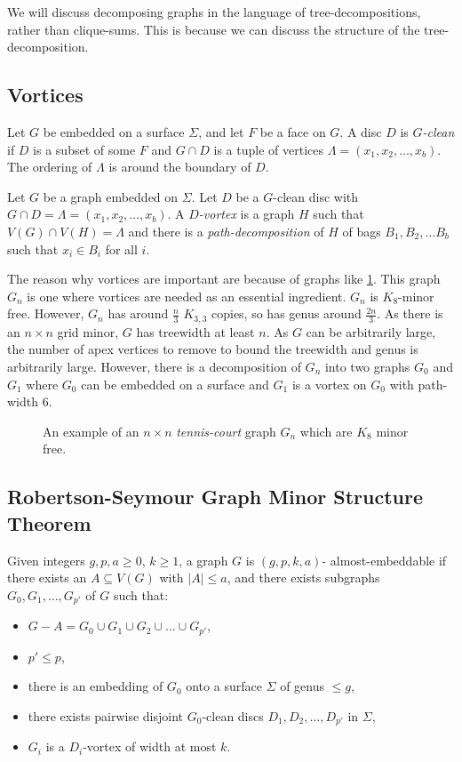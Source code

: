 We will discuss decomposing graphs in the language of tree-decompositions, rather than clique-sums. This is because we can discuss the structure of the tree-decomposition.

\subsection{Vortices}\label{sssec:vortices}
Let \(G\) be embedded on a surface \(\Sigma\), and let \(F\) be a face on \(G\). A disc $D$ is \textit{$G$-clean} if $D$ is a subset of some $F$ and $G \cap D$ is a tuple of vertices \(\Lambda = (x_1, x_2, \ldots, x_b)\). The ordering of $\Lambda$ is around the boundary of $D$. 
\par
Let $G$ be a graph embedded on $\Sigma$. Let $D$ be a $G$-clean disc with $G \cap D = \Lambda = (x_1, x_2, \ldots, x_b)$. A \textit{$D$-vortex} is a graph $H$ such that $V(G) \cap V(H) = \Lambda$ and there is a \textit{path-decomposition} of \(H\) of bags \(B_1, B_2, \ldots B_b\) such that \(x_i \in B_i\) for all \(i\).
\par
The reason why vortices are important are because of graphs like \cref{fig:tenniscourt}. This graph $G_n$ is one where vortices are needed as an essential ingredient. $G_n$ is $K_8$-minor free. However, $G_n$ has around $\frac{n}{3}$ $K_{3,3}$ copies, so has genus around $\frac{2n}{3}$. As there is an $n \times n$ grid minor, $G$ has treewidth at least $n$. As $G$ can be arbitrarily large, the number of apex vertices to remove to bound the treewidth and genus is arbitrarily large. However, there is a decomposition of $G_n$ into two graphs $G_0$ and $G_1$ where $G_0$ can be embedded on a surface and $G_1$ is a vortex on $G_0$ with path-width 6. 

\begin{figure}[h]
	\centering
	
	\caption{An example of an $n \times n$ \textit{tennis-court} graph $G_n$ which are \(K_8\) minor free.}
	\label{fig:tenniscourt}
\end{figure}
\subsection{Robertson-Seymour Graph Minor Structure Theorem}\label{ssec:Robertson_Seymour_Graph_Structure}
Given integers \(g, p, a \geq 0\), \(k \geq 1\), a graph \(G\) is \((g, p, k, a)\)- almost-embeddable if there exists an \(A \subseteq V(G)\) with \(|A| \leq a\), and there exists subgraphs \(G_0, G_1, \ldots,  G_{p'}\) of \(G\) such that:
\begin{itemize}
	\item \(G - A = G_0 \cup G_1 \cup G_2 \cup \ldots \cup G_{p'}\),
	\item \(p' \leq p\),
	\item there is an embedding of \(G_0\) onto a surface \(\Sigma\) of genus \(\leq g\),
	\item there exists pairwise disjoint \(G_0\)-clean discs \(D_1, D_2, \ldots, D_{p'}\) in \(\Sigma\),
	\item \(G_i\) is a \(D_i\)-vortex of width at most \(k\).
\end{itemize}

